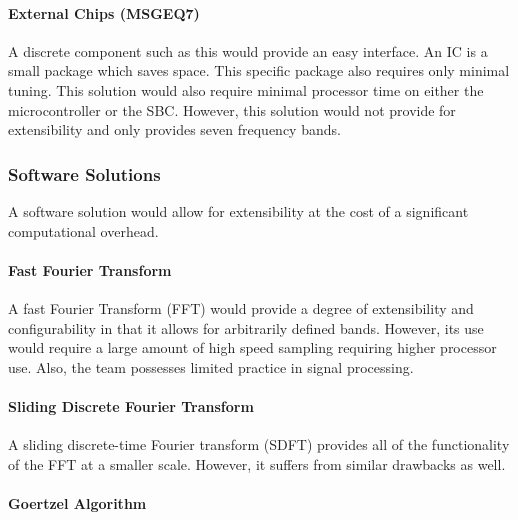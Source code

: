\documentclass{article}
\begin{document}
            \paragraph{External Chips (MSGEQ7)}
        
                A discrete component such as this would provide an easy interface.
                An IC is a small package which saves space.
                This specific package also requires only minimal tuning.
                This solution would also require minimal processor time
                on either the microcontroller or the SBC.
                However, this solution would not provide for extensibility
                and only provides seven frequency bands.
        
        \subsubsection{Software Solutions}
        
            A software solution would allow for extensibility
            at the cost of a significant computational overhead.
        
            \paragraph{Fast Fourier Transform}
        
                A fast Fourier Transform (FFT) would provide a degree
                of extensibility and configurability
                in that it allows for arbitrarily defined bands.
                However, its use would require a large amount
                of high speed sampling requiring higher processor use.
                Also, the  team possesses limited practice in signal processing.
        
            \paragraph{Sliding Discrete Fourier Transform}
        
                A sliding discrete-time Fourier transform (SDFT)
                provides all of the functionality of the FFT
                at a smaller scale.
                However, it suffers from similar drawbacks as well.
        
            \paragraph{Goertzel Algorithm}
        
\end{document}
